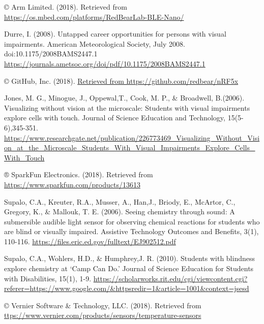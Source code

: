\documentclass[11.5pt]{sig-alternate} %
\begin{document}
\leftskip 0.25in
\parindent -0.25in 

© Arm Limited. (2018). Retrieved from \url{https://os.mbed.com/platforms/RedBearLab-BLE-Nano/}

Durre, I. (2008). Untapped career opportunities for persons with visual impairments. American Meteorological Society, July 2008. doi:10.1175/2008BAMS2447.1 \url{https://journals.ametsoc.org/doi/pdf/10.1175/2008BAMS2447.1}

© GitHub, Inc. (2018). \url{Retrieved from https://github.com/redbear/nRF5x}

Jones, M. G., Minogue, J., Oppewal,T., Cook, M. P., \& Broadwell, B.(2006). Visualizing without vision at the microscale: Students with visual impairments explore cells with touch. Journal of Science Education and Technology, 15(5-6),345-351. \url{https://www.researchgate.net/publication/226773469_Visualizing_Without_Vision_at_the_Microscale_Students_With_Visual_Impairments_Explore_Cells_With_Touch}

® SparkFun Electronics. (2018). Retrieved from \url{https://www.sparkfun.com/products/13613}

Supalo, C.A., Kreuter, R.A., Musser, A., Han,J., Briody, E., McArtor, C., Gregory, K., \& Mallouk, T. E. (2006). Seeing chemistry through sound: A submersible audible light sensor for observing chemical reactions for students who are blind or visually impaired. Assistive Technology Outcomes and Benefits, 3(1), 110-116. \url{https://files.eric.ed.gov/fulltext/EJ902512.pdf}

Supalo, C.A., Wohlers, H.D., \& Humphrey,J. R. (2010). Students with blindness explore chemistry at ‘Camp Can Do.’ Journal of Science Education for Students with Disabilities, 15(1), 1-9. \url{https://scholarworks.rit.edu/cgi/viewcontent.cgi?referer=https://www.google.com/&httpsredir=1&article=1001&context=jsesd}

© Vernier Software \& Technology, LLC. (2018). Retrieved from \url{ttps://www.vernier.com/products/sensors/temperature-sensors}
\end{document}

